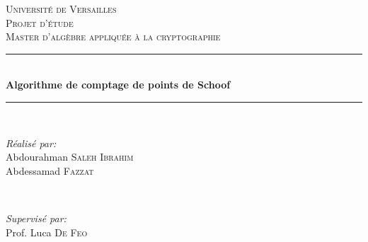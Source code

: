 \documentclass[letterpaper, 12pt]{article}
\begin{document}
\begin{titlepage}

\newcommand{\HRule}{\rule{\linewidth}{0.5mm}} %

\center 
 

\textsc{\LARGE Université de Versailles}\\[1.5cm] %
\textsc{\Large Projet d'étude }\\[0.5cm] %
\textsc{\large Master d'algèbre appliquée à la cryptographie}\\[0.5cm] %


\HRule \\[0.4cm]
{ \huge \bfseries Algorithme de comptage de points de Schoof}\\[0.1cm] %
\HRule \\[1.5cm]
 

\begin{minipage}{0.5\textwidth}
\begin{flushleft} 
\emph{Réalisé par:}\\
Abdourahman \textsc{Saleh Ibrahim}\\
Abdessamad \textsc{Fazzat} 

\end{flushleft}
\end{minipage}
~
\begin{minipage}{0.4\textwidth}
\begin{flushright} 
\emph{Supervisé par:} \\
Prof. Luca \textsc{De Feo} 
\end{flushright}
\end{minipage}\\[2cm]



\end{titlepage}
\end{document}
